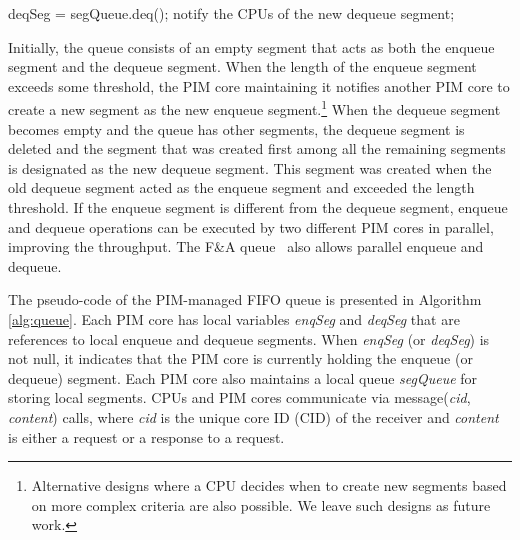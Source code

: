 \begin{algorithm*}[ht!]
{\begin{multicols}{2}
\begin{algorithmic}[1]
\algrestore{}
	\State deqSeg = segQueue.deq();
	\State notify the CPUs of the new dequeue segment; 
\EndProcedure
\end{algorithmic}

\end{multicols}
}
\vspace{-2ex}
\end{algorithm*}

Initially, the queue consists of an empty segment that acts as both
the enqueue segment and the dequeue segment.  When the length of the
enqueue segment exceeds some threshold, the PIM core maintaining it
notifies another PIM core to create a new segment as the new enqueue
segment.\footnote{ Alternative designs where a CPU decides when to
  create new segments based on more complex criteria are also
  possible.  We leave such designs as future work. } When the dequeue
segment becomes empty and the queue has other segments, the dequeue
segment is deleted and the segment that was created first among all
the remaining segments is designated as the new dequeue segment.  This
segment was created when the old dequeue segment acted as the enqueue
segment and exceeded the length threshold.  If the enqueue segment is
different from the dequeue segment, enqueue and dequeue operations can
be executed by two different PIM cores in parallel, improving the
throughput.  The F\&A queue~\cite{Morrison13} also allows parallel
enqueue and dequeue.

The pseudo-code of the PIM-managed FIFO queue is presented in Algorithm \ref{alg:queue}. 
Each PIM core has local variables \textit{enqSeg} and \textit{deqSeg} that are references to 
local enqueue and dequeue segments.
When \textit{enqSeg} (or \textit{deqSeg}) is not null, it indicates that the PIM core is currently 
holding the enqueue (or dequeue) segment.
Each PIM core also maintains a local queue \textit{segQueue} for storing local segments.
CPUs and PIM cores communicate via message(\textit{cid}, \textit{content}) calls, 
where \textit{cid} is the unique core ID (CID) 
of the receiver and \textit{content} is either a request or a response to a request.


